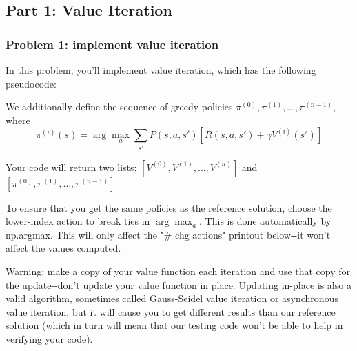 \documentclass[11pt]{article}
\begin{document}
    \subsection{Part 1: Value Iteration}\label{part-1-value-iteration}

    \subsubsection{Problem 1: implement value
iteration}\label{problem-1-implement-value-iteration}

In this problem, you'll implement value iteration, which has the
following pseudocode:

We additionally define the sequence of greedy policies
\(\pi^{(0)}, \pi^{(1)}, \dots, \pi^{(n-1)}\), where
\[\pi^{(i)}(s) = \arg \max_a \sum_{s'} P(s,a,s') [ R(s,a,s') + \gamma V^{(i)}(s')]\]

Your code will return two lists: \([V^{(0)}, V^{(1)}, \dots, V^{(n)}]\)
and \([\pi^{(0)}, \pi^{(1)}, \dots, \pi^{(n-1)}]\)

To ensure that you get the same policies as the reference solution,
choose the lower-index action to break ties in \(\arg \max_a\). This is
done automatically by np.argmax. This will only affect the "\# chg
actions" printout below-\/-it won't affect the values computed.

Warning: make a copy of your value function each iteration and use that
copy for the update-\/-don't update your value function in place.
Updating in-place is also a valid algorithm, sometimes called
Gauss-Seidel value iteration or asynchronous value iteration, but it
will cause you to get different results than our reference solution
(which in turn will mean that our testing code won't be able to help in
verifying your code).
\end{document}
